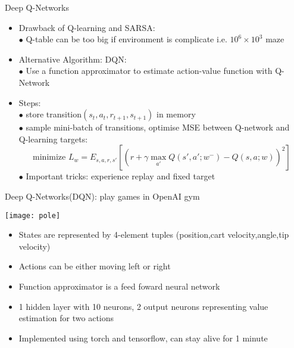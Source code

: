 \begin{frame}{Deep Q-Networks}
    \begin{itemize}
         \item Drawback of Q-learning and SARSA:\\
         \bigskip
         \hspace{0.5cm}$\bullet$ Q-table can be too big if environment is complicate i.e. $10^6\times10^3$ maze\\
         \bigskip
         \item Alternative Algorithm: DQN:\\
         \bigskip
         \hspace{0.5cm}$\bullet$ Use a function approximator to estimate action-value function with Q-Network\\
         \bigskip
         \item Steps:\\
         \bigskip
         \hspace{0.5cm}$\bullet$ store transition$(s_{t},a_{t},r_{t+1},s_{t+1})$ in memory\\
         \hspace{0.5cm}$\bullet$ sample mini-batch of transitions, optimise MSE between Q-network and \\
         \hspace{0.7cm} Q-learning targets:\\
         \begin{equation}
            \text{minimize  }  L_{w}=E_{s,a,r,s'}[(r+\gamma \max\limits_{a'}Q(s',a';w^{-})-Q(s,a;w))^2]
        \end{equation}
        \hspace{0.5cm}$\bullet$ Important tricks: experience replay and fixed target

    \end{itemize}
\end{frame}


\begin{frame}{Deep Q-Networks(DQN): play games in OpenAI gym}
    \begin{center}\texttt{[image: pole]}\end{center}
    \begin{itemize}
        \item States are represented by 4-element tuples (position,cart velocity,angle,tip velocity)
        \item Actions can be either moving left or right
        \item Function approximator is a feed foward neural network 
        \item 1 hidden layer with 10 neurons, 2 output neurons representing value estimation for two actions
        \item Implemented using torch and tensorflow, can stay alive for 1 minute
    \end{itemize}

\end{frame}







